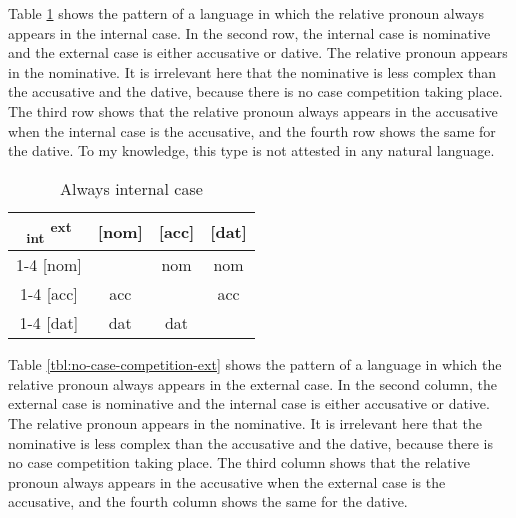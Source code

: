 Table \ref{tbl:no-case-competition-int} shows the pattern of a language in which the relative pronoun always appears in the internal case. In the second row, the internal case is nominative and the external case is either accusative or dative. The relative pronoun appears in the nominative. It is irrelevant here that the nominative is less complex than the accusative and the dative, because there is no case competition taking place. The third row shows that the relative pronoun always appears in the accusative when the internal case is the accusative, and the fourth row shows the same for the dative. To my knowledge, this type is not attested in any natural language.

\begin{table}[H]
  \center
  \caption{Always internal case}
  \begin{tabular}{c|c|c|c}
    \toprule
   \textsubscript{\ac{int}} \textsuperscript{\ac{ext}}
          & [\ac{nom}]
          & [\ac{acc}]
          & [\ac{dat}]
          \\ \cmidrule{1-4}
      [\ac{nom}]
          & \xcancel{\phantom{xx}}
          & \ac{nom}
          & \ac{nom}
          \\ \cmidrule{1-4}
      [\ac{acc}]
          & \ac{acc}
          & \xcancel{\phantom{xx}}
          & \ac{acc}
          \\ \cmidrule{1-4}
      [\ac{dat}]
          & \ac{dat}
          & \ac{dat}
          & \xcancel{\phantom{xx}}
          \\
    \bottomrule
  \end{tabular}
  \label{tbl:no-case-competition-int}
\end{table}

Table \ref{tbl:no-case-competition-ext} shows the pattern of a language in which the relative pronoun always appears in the external case. In the second column, the external case is nominative and the internal case is either accusative or dative. The relative pronoun appears in the nominative. It is irrelevant here that the nominative is less complex than the accusative and the dative, because there is no case competition taking place. The third column shows that the relative pronoun always appears in the accusative when the external case is the accusative, and the fourth column shows the same for the dative.

